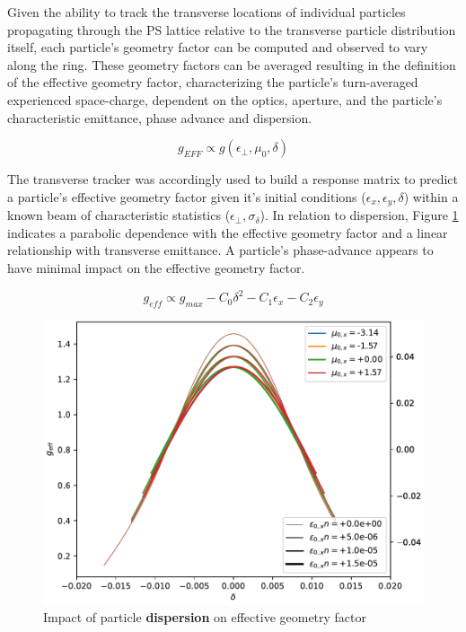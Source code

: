 Given the ability to track the transverse locations of individual particles propagating through the PS lattice relative to the transverse particle distribution itself, each particle's geometry factor can be computed and observed to vary along the ring. These geometry factors can be averaged resulting in the definition of the effective geometry factor, characterizing the particle's turn-averaged experienced space-charge, dependent on the optics, aperture, and the particle's characteristic emittance, phase advance and dispersion.

$$g_{EFF} \propto g(\epsilon_\perp, \mu_0, \delta)$$

The transverse tracker was accordingly used to build a response matrix to predict a particle's effective geometry factor given it's initial conditions ($\epsilon_x, \epsilon_y, \delta$) within a known beam of characteristic statistics ($\epsilon_\perp, \sigma_\delta$). In relation to dispersion, Figure \ref{fig:g_eff_dispersion} indicates a parabolic dependence with the effective geometry factor and a linear relationship with transverse emittance. A particle's phase-advance appears to have minimal impact on the effective geometry factor.

$$g_{eff} \propto g_{max} - C_0\delta^2 - C_1\epsilon_x - C_2\epsilon_y$$

\begin{figure}
    \centering
    \includegraphics{figs/g_dispersion.pdf}
    \caption{Impact of particle \textbf{dispersion} on effective geometry factor}
    \label{fig:g_eff_dispersion}
\end{figure}

